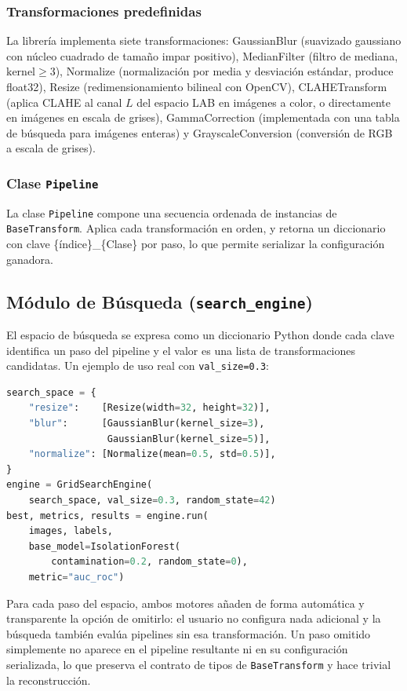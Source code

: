 \documentclass[conference,spanish]{IEEEtran}
\begin{document}
\subsubsection{Transformaciones predefinidas}

La librería implementa siete transformaciones: GaussianBlur
(suavizado gaussiano con núcleo cuadrado de tamaño impar positivo),
MedianFilter (filtro de mediana, $\text{kernel} \geq 3$),
Normalize (normalización por media y desviación estándar, produce
float32), Resize (redimensionamiento bilineal con
OpenCV), CLAHETransform (aplica CLAHE al canal $L$ del espacio
LAB en imágenes a color, o directamente en imágenes en escala de grises),
GammaCorrection (implementada con una tabla de búsqueda para imágenes enteras) y
GrayscaleConversion (conversión de RGB a escala de grises).

\subsubsection{Clase \texttt{Pipeline}}

La clase \texttt{Pipeline} compone una secuencia ordenada de instancias de
\texttt{BaseTransform}. Aplica cada
transformación en orden, y retorna un diccionario
con clave \{índice\}\_\{Clase\} por paso, lo que permite
serializar la configuración ganadora.

\subsection{Módulo de Búsqueda (\texttt{search\_engine})}

El espacio de búsqueda se expresa como un diccionario Python donde cada
clave identifica un paso del pipeline y el valor es una lista de
transformaciones candidatas. Un ejemplo de uso real con
\texttt{val\_size=0.3}:

\begin{lstlisting}[language=Python]
search_space = {
    "resize":    [Resize(width=32, height=32)],
    "blur":      [GaussianBlur(kernel_size=3),
                  GaussianBlur(kernel_size=5)],
    "normalize": [Normalize(mean=0.5, std=0.5)],
}
engine = GridSearchEngine(
    search_space, val_size=0.3, random_state=42)
best, metrics, results = engine.run(
    images, labels,
    base_model=IsolationForest(
        contamination=0.2, random_state=0),
    metric="auc_roc")
\end{lstlisting}

Para cada paso del espacio, ambos motores añaden de forma automática y
transparente la opción de omitirlo: el usuario no configura nada
adicional y la búsqueda también evalúa pipelines sin esa transformación. Un
paso omitido simplemente no aparece en el pipeline resultante ni en su
configuración serializada, lo que preserva el contrato de tipos de
\texttt{BaseTransform} y hace trivial la reconstrucción.
\end{document}
